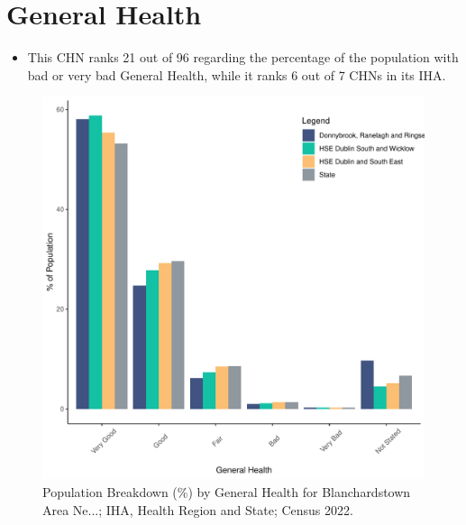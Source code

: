 \documentclass{article}
\begin{document}
\pagebreak

\section{General Health}\label{sect:GenHealth}
\begin{itemize}
\item  This CHN ranks  21 out of 96 regarding the percentage of the population with bad or very bad General Health, while it ranks   6 out of 7 CHNs in its IHA.
\end{itemize}
\begin{figure}[h]
	\centering
	\includegraphics[width = 150mm]{../figures/GenED.pdf}
	\caption{Population Breakdown (\%) by General Health for Blanchardstown Area Ne...; IHA, Health Region and State;  Census 2022.}
	\label{fig:2ae19629-1a6a-13a3-e055-000000000001}
	\end{figure}
\end{document}
